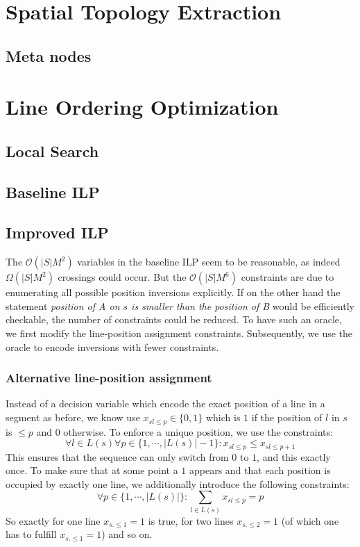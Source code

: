 \documentclass{llncs}
\begin{document}
\section{Spatial Topology Extraction}
%




\subsection{Meta nodes}

%
\section{Line Ordering Optimization}
%




%
\subsection{Local Search}
%
%
\subsection{Baseline ILP}
%
%
\subsection{Improved ILP}
%
The $\mathcal{O}(|S|M^{2})$ variables in the baseline ILP seem to be reasonable, as indeed $\Omega(|S|M^{2})$ crossings could occur. But the $\mathcal{O}(|S|M^{6})$ constraints are due to enumerating all possible position inversions explicitly. If on the other hand the statement \emph{position of A on $s$ is smaller than the position of B} would be efficiently checkable, the number of constraints could be reduced. To have such an oracle, we first modify the line-position assignment constraints. Subsequently, we use  the oracle to encode inversions with fewer constraints.
\subsubsection{Alternative line-position assignment}
Instead of a decision variable which encode the exact position of a line in a segment as before, we know use $x_{sl\leq p} \in \{0,1\}$ which is $1$ if the position of $l$ in $s$ is $\leq p$ and $0$ otherwise. To enforce a unique position, we use the constraints:
$$\forall l \in L(s) \forall p \in \{1, \cdots, |L(s)|-1\}: x_{sl\leq p} \leq x_{sl\leq p+1}$$
This ensures that the sequence can only switch from $0$ to $1$, and this exactly once. To make sure that at some point a $1$ appears and that each position is occupied by exactly one line, we additionally introduce the following constraints:
$$\forall p \in \{1, \cdots, |L(s)|\}: \sum_{l \in L(s)} x_{sl\leq p} = p$$
So exactly for  one line $x_{s.\leq 1} =1$ is true, for two lines $x_{s.\leq 2} = 1$ (of which one has to fulfill $x_{s.\leq 1} =1$) and so on.
\end{document}
